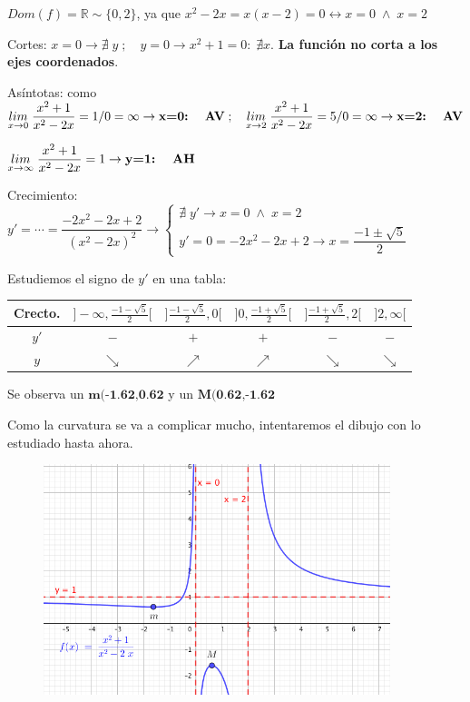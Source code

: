 \begin{proofw}\renewcommand{\qedsymbol}{$\diamond$}	
	$Dom(f)=\mathbb R \sim \{0,2\}$, ya que $x^2-2x=x(x-2)=0 \leftrightarrow x=0 \; \wedge \; x=2$
	
	Cortes: $x=0 \to \nexists \; y \; ; \quad y=0 \to x^2+1=0: \; \nexists x$. \textbf{La función no corta a los ejes coordenados}.
	
	Asíntotas:  como $\underset {x\to 0}{lim }\;{\dfrac {x^2+1}{x^2-2x}}=1/0=\infty \to \textbf{x=0: \; AV}\; ; \quad  \underset {x\to 2}{lim }\;{\dfrac {x^2+1}{x^2-2x}}=5/0=\infty \to \textbf{x=2: \; AV}$
	
		$\underset {x\to \infty}{lim}\; {\dfrac {x^2+1}{x^2-2x}}=1 \to \textbf{y=1: \; AH}$
		
		\noindent Crecimiento: $y'=\cdots=\dfrac {-2x^2-2x+2}{(x^2-2x)^2} \to \begin{cases}
 			\nexists \; y' \to x=0 \; \wedge \; x=2 \\
 			y'=0=-2x^2-2x+2 \to x=\dfrac {-1\pm \sqrt{5}}{2}
 			\end{cases}$
 			
 			Estudiemos el signo de $y'$ en una tabla:
 			
 	\begin{table}[H]
 	\centering
	\begin{tabular}{|c|c|c|c|c|c|}
	\hline
 	Crecto.& $]-\infty,\frac {-1-\sqrt{5}}{2}[$ & $]\frac {-1-\sqrt{5}}{2},0[$ & $]0,\frac {-1+\sqrt{5}}{2}[$ & $]\frac {-1+\sqrt{5}}{2},2[$  & $]2,\infty[$ \\ \hline
 	$y'$& $-$ &  $+$  & $+$   &  $-$  &  $-$  \\ \hline
 	$y$& $\searrow$ & $\nearrow$ &  $\nearrow$ & $\searrow$ & $\searrow$ \\ \hline
	\end{tabular}
	\end{table}
	
		Se observa un $\textbf{m(-1.62,0.62}$ y un $\textbf{M(0.62,-1.62}$
		
		Como la curvatura se va a complicar mucho, intentaremos el dibujo con lo estudiado hasta ahora.
		
		\begin{figure}[H]
			\centering
			\includegraphics[width=0.9\textwidth]{imagenes/imagenes05/T05IM32.png}
		\end{figure}
		
\end{proofw}


